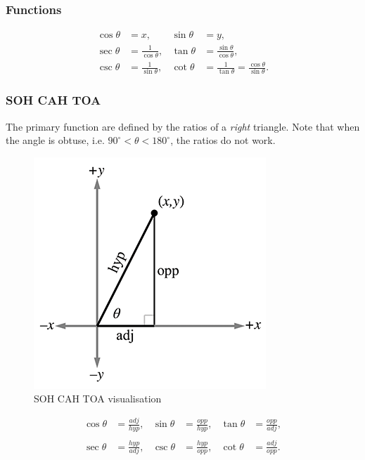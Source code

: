 \documentclass[a4paper,11pt]{article}
\begin{document}
\subsubsection{Functions}

\begin{align*}
\cos\theta &=x, &\sin\theta &=y, \\
\sec\theta &=\frac{1}{\cos\theta}, &\tan\theta &=\frac{\sin\theta}{\cos\theta}, \\
\csc\theta &=\frac{1}{\sin\theta}, &\cot\theta &=\frac{1}{\tan\theta}=\frac{\cos\theta}{\sin\theta}.
\end{align*}

\subsubsection{SOH CAH TOA}

The primary function are defined by the ratios of a \emph{right} triangle. Note that when the angle is obtuse, i.e. $90^\circ < \theta < 180^\circ$, the ratios do not work.

\begin{figure}[H]
\centering
    \includegraphics{01_sohcahtoa}
\caption{SOH CAH TOA visualisation}
\label{fig:soh-cah-toa-visualization}
\end{figure}

\[\begin{matrix}
{\cos\theta} & {= \frac{\mathit{a}\mathit{d}\mathit{j}}{\mathit{h}\mathit{y}\mathit{p}},} & {\sin\theta} & {= \frac{\mathit{o}\mathit{p}\mathit{p}}{\mathit{h}\mathit{y}\mathit{p}},} & {\tan\theta} & {= \frac{\mathit{o}\mathit{p}\mathit{p}}{\mathit{a}\mathit{d}\mathit{j}},} \\
 & & & & & \\
{\sec\theta} & {= \frac{\mathit{h}\mathit{y}\mathit{p}}{\mathit{a}\mathit{d}\mathit{j}},} & {\csc\theta} & {= \frac{\mathit{h}\mathit{y}\mathit{p}}{\mathit{o}\mathit{p}\mathit{p}},} & {\cot\theta} & {= \frac{\mathit{a}\mathit{d}\mathit{j}}{\mathit{o}\mathit{p}\mathit{p}}.} \\
\end{matrix}\]
\end{document}
